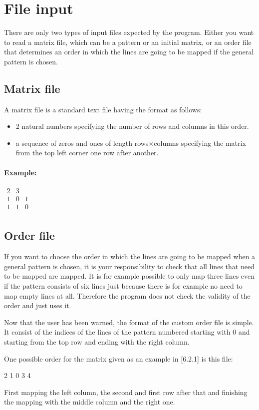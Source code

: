 \section{File input}
There are only two types of input files expected by the program. Either you want to read a matrix file, which can be a pattern or an initial matrix, or an order file that determines an order in which the lines are going to be mapped if the general pattern is chosen.

\subsection{Matrix file}
A matrix file is a standard text file having the format as follows:
\begin{itemize}
\item 2 natural numbers specifying the number of rows and columns in this order.
\item a sequence of zeros and ones of length rows$\times$columns specifying the matrix from the top left corner one row after another.
\end{itemize}
\paragraph{Example:}
$\begin{array}{ccc}
2 & 3 & \\
1 & 0 & 1 \\
1 & 1 & 0 \\
\end{array}$

\subsection{Order file}
If you want to choose the order in which the lines are going to be mapped when a general pattern is chosen, it is your responsibility to check that all lines that need to be mapped are mapped. It is for example possible to only map three lines even if the pattern consists of six lines just because there is for example no need to map empty lines at all. Therefore the program does not check the validity of the order and just uses it.

Now that the user has been warned, the format of the custom order file is simple. It consist of the indices of the lines of the pattern numbered starting with 0 and starting from the top row and ending with the right column.

One possible order for the matrix given as an example in [6.2.1] is this file:
\begin{center}
2 1 0 3 4
\end{center}
First mapping the left column, the second and first row after that and finishing the mapping with the middle column and the right one.

